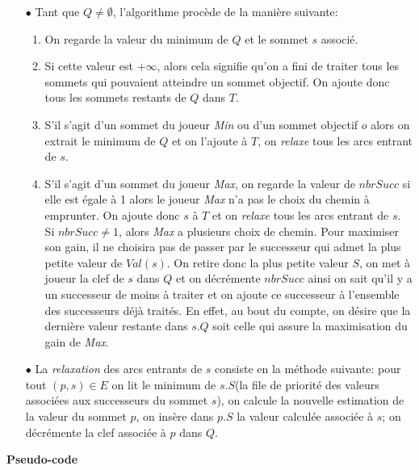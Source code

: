 \begin{enumerate}
	\item[$\bullet$] Tant que $Q \neq \emptyset$, l'algorithme procède de la manière suivante: 
	\begin{enumerate}
		\item On regarde la valeur du minimum de $Q$ et le sommet $s$ associé.
		\item Si cette valeur est $+\infty$, alors cela signifie qu'on a fini de traiter tous les sommets qui pouvaient atteindre un sommet objectif. On ajoute donc tous les sommets restants de $Q$ dans $T$.
		\item S'il s'agit d'un sommet du joueur \textit{Min} ou d'un sommet objectif $o$ alors on extrait le minimum de $Q$ et on l'ajoute à $T$, on \textit{relaxe} tous les arcs entrant de $s$.
		\item S'il s'agit d'un sommet du joueur \textit{Max}, on regarde la valeur de $nbrSucc$ si elle est égale à 1 alors le joueur \textit{Max} n'a pas le choix du chemin à emprunter. On ajoute donc $s$ à $T$ et on \textit{relaxe} tous les arcs entrant de $s$. Si $nbrSucc \neq 1$, alors \textit{Max} a plusieurs choix de chemin. Pour maximiser son gain, il ne choisira pas de passer par le successeur qui admet la plus petite valeur de $Val(s)$. On retire donc la plus petite valeur $S$, on met à joueur la clef de $s$ dans $Q$ et on décrémente $nbrSucc$ ainsi on sait qu'il y a un successeur de moins à traiter et on ajoute ce successeur à l'ensemble des successeurs déjà traités. En effet, au bout du compte, on désire que la dernière valeur restante dans $s.Q$ soit celle qui assure la maximisation du gain de \textit{Max}.
	\end{enumerate}
	
	\item[$\bullet$] La \textit{relaxation} des arcs entrants de $s$ consiste en la méthode suivante: pour tout $(p,s)\in E$ on lit le minimum de $s.S$(la file de priorité des valeurs associées aux successeurs du sommet $s$), on calcule la nouvelle estimation de la valeur du sommet $p$, on insère dans $p.S$ la valeur calculée associée à $s$; on décrémente la clef associée à $p$ dans $Q$.
	
\end{enumerate}

\noindent \textbf{Pseudo-code}\\

